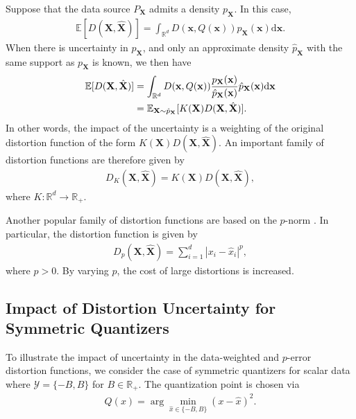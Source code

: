 \documentclass[conference]{IEEEtran}
\begin{document}
Suppose that the data source $P_{\mathbf{X}}$ admits a density $p_{\mathbf{X}}$. In this case, 
\begin{align}
	\mathbb{E}[D(\mathbf{X},\hat{\mathbf{X}})] = \int_{\mathbb{R}^d} D(\mathbf{x},Q(\mathbf{x}))p_{\mathbf{X}}(\mathbf{x})\mathrm{d}\mathbf{x}.
\end{align}
When there is uncertainty in $p_{\mathbf{X}}$, and only an approximate density $\hat{p}_{\mathbf{X}}$ with the same support as $p_{\mathbf{X}}$ is known, we then have 
\begin{align}
	\mathbb{E}[D(\mathbf{X},\hat{\mathbf{X}})] &= \int_{\mathbb{R}^d} D(\mathbf{x},Q(\mathbf{x}))\frac{p_{\mathbf{X}}(\mathbf{x})}{\hat{p}_{\mathbf{X}}(\mathbf{x})}\hat{p}_{\mathbf{X}}(\mathbf{x})\mathrm{d}\mathbf{x}\notag\\
	&= \mathbb{E}_{\mathbf{X} \sim \hat{p}_{\mathbf{X}}}[K(\mathbf{X})D(\mathbf{X},\hat{\mathbf{X}})].
\end{align}
In other words, the impact of the uncertainty is a weighting of the original distortion function of the form $K(\mathbf{X})D(\mathbf{X},\hat{\mathbf{X}})$. An important family of distortion functions are therefore given by 
\begin{align}\label{eq:weight_distort}
	D_K(\mathbf{X},\hat{\mathbf{X}}) = K(\mathbf{X})D(\mathbf{X},\hat{\mathbf{X}}),
\end{align}
where $K:\mathbb{R}^d \rightarrow \mathbb{R}_+$. 

Another popular family of distortion functions are based on the $p$-norm \cite{Linde1980algorithm,Nahshan2021loss}. In particular, the distortion function is given by 
\begin{align}\label{eq:p_norm}
	D_p(\mathbf{X},\hat{\mathbf{X}}) = \sum_{i=1}^d |x_i - \hat{x}_i|^p,
\end{align}
where $p > 0$. By varying $p$, the cost of large distortions is increased. 

\subsection{Impact of Distortion Uncertainty for Symmetric Quantizers}

To illustrate the impact of uncertainty in the data-weighted and $p$-error distortion functions, we consider the case of symmetric quantizers for scalar data where $\mathcal{Y} = \{-B,B\}$ for $B \in \mathbb{R}_+$. The quantization point is chosen via 
\begin{align}
	Q(x) = \arg\min_{\hat{x} \in \{-B,B\}} (x - \hat{x})^2.
\end{align}
\end{document}
